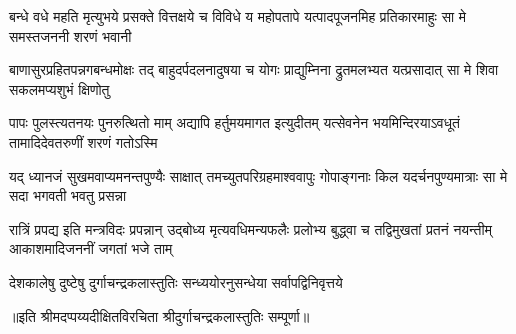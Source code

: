 \fourlineindentedshloka
{बन्धे वधे महति मृत्युभये प्रसक्ते}
{वित्तक्षये च विविधे य महोपतापे}
{यत्पादपूजनमिह प्रतिकारमाहुः}
{सा मे समस्तजननी शरणं भवानी} %

\fourlineindentedshloka
{बाणासुरप्रहितपन्नगबन्धमोक्षः}
{तद् बाहुदर्पदलनादुषया च योगः}
{प्राद्युम्निना द्रुतमलभ्यत यत्प्रसादात्}
{सा मे शिवा सकलमप्यशुभं क्षिणोतु} %

\fourlineindentedshloka
{पापः पुलस्त्यतनयः पुनरुत्थितो माम्}
{अद्यापि हर्तुमयमागत इत्युदीतम्}
{यत्सेवनेन भयमिन्दिरयाऽवधूतं}
{तामादिदेवतरुणीं शरणं गतोऽस्मि} %

\fourlineindentedshloka
{यद् ध्यानजं सुखमवाप्यमनन्तपुण्यैः}
{साक्षात् तमच्युतपरिग्रहमाश्ववापुः}
{गोपाङ्गनाः किल यदर्चनपुण्यमात्राः}
{सा मे सदा भगवती भवतु प्रसन्ना} %

\fourlineindentedshloka
{रात्रिं प्रपद्य इति मन्त्रविदः प्रपन्नान्}
{उद्बोध्य मृत्यवधिमन्यफलैः प्रलोभ्य}
{बुद्ध्वा च तद्विमुखतां प्रतनं नयन्तीम्}
{आकाशमादिजननीं जगतां भजे ताम्} %

\twolineshloka
{देशकालेषु दुष्टेषु दुर्गाचन्द्रकलास्तुतिः}
{सन्ध्ययोरनुसन्धेया सर्वापद्विनिवृत्तये} %

॥इति श्रीमदप्पय्यदीक्षितविरचिता श्रीदुर्गाचन्द्रकलास्तुतिः सम्पूर्णा॥
